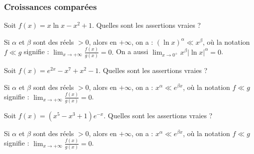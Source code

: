 \subsubsection{Croissances comparées}

\begin{question} 
Soit $f(x)= x\ln x -x^2+1$. Quelles sont les assertions vraies ?
\begin{answers}



\end{answers}
\begin{explanations}
Si $\alpha$ et $ \beta$ sont des réels $>0$, alors  en $+\infty$, on a :
$(\ln x)^{\alpha} \ll x^{\beta}$, où la notation $f\ll g$ signifie : $\lim_{x \to + \infty} \frac{f(x)}{g(x)}=0. $  
On a aussi  $\lim_{x\to 0^+} x^{\beta} |\ln x|^{\alpha} = 0$.
\end{explanations}

\end{question}


\begin{question} 
Soit $f(x)= e^{2x}-x^7+x^2-1$. Quelles sont les assertions vraies ?
\begin{answers}



\end{answers}
\begin{explanations}
Si $\alpha$ et $ \beta$ sont des réels $>0$, 
alors en $+\infty$, on a :
$ x^{\alpha}\ll  e^{\beta x}$, où la notation $f\ll g$ signifie : $\lim_{x \to + \infty} \frac{f(x)}{g(x)}=0 $.
\end{explanations}

\end{question}


\begin{question} 
Soit $f(x)= (x^5-x^3+1)e^{-x}$. Quelles sont les assertions vraies ?
\begin{answers}



\end{answers}
\begin{explanations}
Si $\alpha$ et $ \beta$ sont des réels $>0$, 
alors  en $+\infty$, on a :
$ x^{\alpha}\ll  e^{\beta x}$, où la notation $f\ll g$ signifie : $\lim_{x \to + \infty} \frac{f(x)}{g(x)}=0 $.
\end{explanations}

\end{question}



